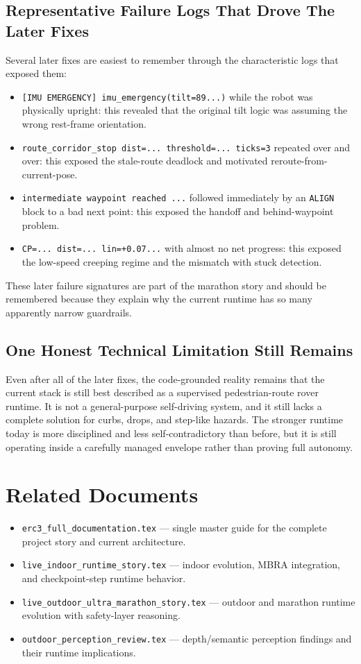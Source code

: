 \documentclass[11pt]{article}
\begin{document}
\subsection{Representative Failure Logs That Drove The Later Fixes}
Several later fixes are easiest to remember through the characteristic logs that exposed them:
\begin{itemize}[leftmargin=*]
\item \texttt{[IMU EMERGENCY] imu\_emergency(tilt=89...)} while the robot was physically upright: this revealed that the original tilt logic was assuming the wrong rest-frame orientation.
\item \texttt{route\_corridor\_stop dist=... threshold=... ticks=3} repeated over and over: this exposed the stale-route deadlock and motivated reroute-from-current-pose.
\item \texttt{intermediate waypoint reached ...} followed immediately by an \texttt{ALIGN} block to a bad next point: this exposed the handoff and behind-waypoint problem.
\item \texttt{CP=... dist=... lin=+0.07...} with almost no net progress: this exposed the low-speed creeping regime and the mismatch with stuck detection.
\end{itemize}

These later failure signatures are part of the marathon story and should be remembered because they explain why the current runtime has so many apparently narrow guardrails.

\subsection{One Honest Technical Limitation Still Remains}
Even after all of the later fixes, the code-grounded reality remains that the current stack is still best described as a supervised pedestrian-route rover runtime. It is not a general-purpose self-driving system, and it still lacks a complete solution for curbs, drops, and step-like hazards. The stronger runtime today is more disciplined and less self-contradictory than before, but it is still operating inside a carefully managed envelope rather than proving full autonomy.


\section{Related Documents}
\begin{itemize}
  \item \texttt{erc3\_full\_documentation.tex} --- single master guide for the complete project story and current architecture.
  \item \texttt{live\_indoor\_runtime\_story.tex} --- indoor evolution, MBRA integration, and checkpoint-step runtime behavior.
  \item \texttt{live\_outdoor\_ultra\_marathon\_story.tex} --- outdoor and marathon runtime evolution with safety-layer reasoning.
  \item \texttt{outdoor\_perception\_review.tex} --- depth/semantic perception findings and their runtime implications.
\end{itemize}
\end{document}
